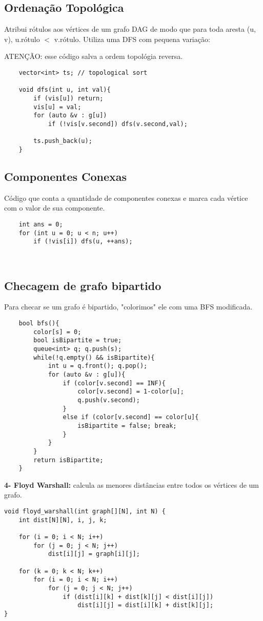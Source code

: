\subsection{Ordenação Topológica} 
Atribui rótulos aos vértices de um grafo DAG de modo que para toda aresta (u, v), 
u.rótulo $<$ v.rótulo. Utiliza uma DFS com pequena variação:
\par ATENÇÃO: esse código salva a ordem topológia reversa.
\begin{verbatim}
    vector<int> ts; // topological sort
    
    void dfs(int u, int val){
        if (vis[u]) return;
        vis[u] = val;
        for (auto &v : g[u])
            if (!vis[v.second]) dfs(v.second,val);
        
        ts.push_back(u);   
    }
\end{verbatim}

\subsection{Componentes Conexas}
\par Código que conta a quantidade de componentes conexas e marca cada vértice com o valor de sua componente.
\begin{verbatim}
    int ans = 0;
    for (int u = 0; u < n; u++)
        if (!vis[i]) dfs(u, ++ans);
        
    
\end{verbatim}

\subsection{Checagem de grafo bipartido}
\par Para checar se um grafo é bipartido, "colorimos" ele com uma BFS modificada.
\begin{verbatim}
    bool bfs(){
        color[s] = 0;
        bool isBipartite = true;
        queue<int> q; q.push(s);
        while(!q.empty() && isBipartite){
            int u = q.front(); q.pop();
            for (auto &v : g[u]){
                if (color[v.second] == INF){
                    color[v.second] = 1-color[u];
                    q.push(v.second);
                }
                else if (color[v.second] == color[u]{
                    isBipartite = false; break;
                }
            }
        }
        return isBipartite;
    }
\end{verbatim}


\textbf{4- Floyd Warshall:} calcula as menores distâncias entre todos os vértices de um grafo.
    \begin{verbatim}
void floyd_warshall(int graph[][N], int N) {
    int dist[N][N], i, j, k;

    for (i = 0; i < N; i++)
        for (j = 0; j < N; j++)
            dist[i][j] = graph[i][j];

    for (k = 0; k < N; k++) 
        for (i = 0; i < N; i++) 
            for (j = 0; j < N; j++) 
                if (dist[i][k] + dist[k][j] < dist[i][j])
                    dist[i][j] = dist[i][k] + dist[k][j];
}
    \end{verbatim}
\pagebreak
